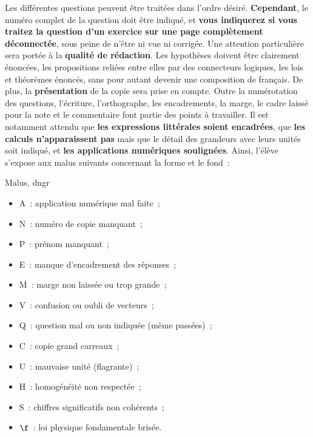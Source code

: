 \documentclass[11pt]{book}
\begin{document}
{Les différentes questions peuvent être traitées dans l'ordre désiré.
\textbf{Cependant}, le numéro complet de la question doit être indiqué, et
\textbf{vous indiquerez si vous traitez la question d'un exercice sur une page
	complètement déconnectée}, sous peine de n'être ni vue ni corrigée.
\bigbreak
Une attention particulière sera portée à la \textbf{qualité de rédaction}. Les
hypothèses doivent être clairement énoncées, les propositions reliées entre
elles par des connecteurs logiques, les lois et théorèmes énoncés, sans pour
autant devenir une composition de français.
\bigbreak
De plus, la \textbf{présentation} de la copie sera prise en compte. Outre la
numérotation des questions, l'écriture, l'orthographe, les encadrements, la
marge, le cadre laissé pour la note et le commentaire font partie des points à
travailler. Il est notamment attendu que \textbf{les expressions littérales
	soient encadrées}, que \textbf{les calculs n'apparaissent pas} mais que le
détail des grandeurs avec leurs unités soit indiqué, et \textbf{les applications
	numériques soulignées}.
\bigbreak
Ainsi, l'élève s'expose aux malus suivants concernant la forme et le fond~:
\begin{tprop}{Malus, dngr}
	\begin{minipage}{0.50\linewidth}
		\begin{itemize}
			\item A~: application numérique mal faite~;
			\item N~: numéro de copie manquant~;
			\item P~: prénom manquant~;
			\item E~: manque d'encadrement des réponses~;
			\item M~: marge non laissée ou trop grande~;
			\item V~: confusion ou oubli de vecteurs~;
		\end{itemize}
	\end{minipage}
	\begin{minipage}{0.50\linewidth}
		\begin{itemize}
			\item Q~: question mal ou non indiquée (même passées)~;
			\item C~: copie grand carreaux~;
			\item U~: mauvaise unité (flagrante)~;
			\item H~: homogénéité non respectée~;
			\item S~: chiffres significatifs non cohérents~;
			\item $\f$~: loi physique fondamentale brisée.
		\end{itemize}
	\end{minipage}
\end{tprop}

}
\end{document}
